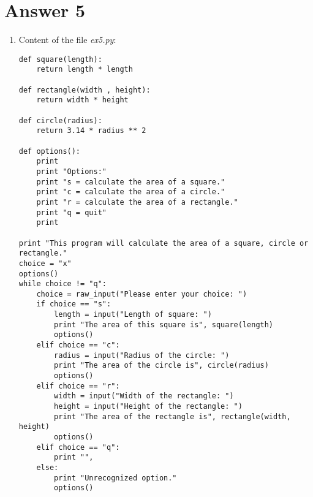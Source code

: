 \documentclass[11pt,a4paper]{article}
\begin{document}
\section*{Answer 5}
\begin{enumerate}
\item Content of the file {\it ex5.py}:
\begin{verbatim}
def square(length):
    return length * length
 
def rectangle(width , height):
    return width * height
 
def circle(radius):
    return 3.14 * radius ** 2
 
def options():
    print
    print "Options:"
    print "s = calculate the area of a square."
    print "c = calculate the area of a circle."
    print "r = calculate the area of a rectangle."
    print "q = quit"
    print
 
print "This program will calculate the area of a square, circle or rectangle."
choice = "x"
options()
while choice != "q":
    choice = raw_input("Please enter your choice: ")
    if choice == "s":
        length = input("Length of square: ")
        print "The area of this square is", square(length)
        options()
    elif choice == "c":
        radius = input("Radius of the circle: ")
        print "The area of the circle is", circle(radius)
        options()
    elif choice == "r":
        width = input("Width of the rectangle: ")
        height = input("Height of the rectangle: ")
        print "The area of the rectangle is", rectangle(width, height)
        options()
    elif choice == "q":
        print "",
    else:
        print "Unrecognized option."
        options()
\end{verbatim}

\end{enumerate}
\end{document}

